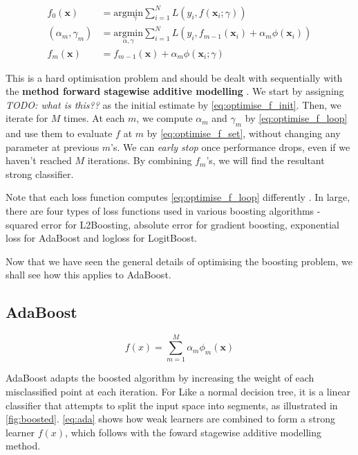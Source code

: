 \begin{align}
  f_0(\mathbf{x}) &= \mathrm{arg} \underset{\gamma}{\mathrm{min}} \sum_{i=1}^{N} L(y_i,f(\mathbf{x}_i ; \gamma)) \label{eq:optimise_f_init}
  \\
  (\alpha_m,\gamma_m) &= \underset{\alpha,\gamma}{\mathrm{argmin}} \sum_{i=1}^{N} L(y_i, f_{m-1}(\mathbf{x}_i) + \alpha_m\phi(\mathbf{x}_i)) \label{eq:optimise_f_loop}
  \\
  f_m(\mathbf{x}) &= f_{m-1}(\mathbf{x}) + \alpha_m\phi(\mathbf{x}_i;\gamma) \label{eq:optimise_f_set}
\end{align}

This is a hard optimisation problem and should be dealt with sequentially with the \textbf{method forward stagewise additive modelling} \cite{mur-book}. We start by assigning \textit{TODO: what is this??} as the initial estimate by \autoref{eq:optimise_f_init}. Then, we iterate for $M$ times. At each $m$, we compute $\alpha_m$ and $\gamma_m$ by \autoref{eq:optimise_f_loop} and use them to evaluate $f$ at $m$ by \autoref{eq:optimise_f_set}, without changing any parameter at previous $m$'s. We can \textit{early stop} once performance drops, even if we haven't reached $M$ iterations. By combining $f_m$'s, we will find the resultant strong classifier. 

Note that each loss function computes \autoref{eq:optimise_f_loop} differently \cite{mur-book}. In large, there are four types of loss functions used in various boosting algorithms - squared error for L2Boosting, absolute error for gradient boosting, exponential loss for AdaBoost and logloss for LogitBoost.

Now that we have seen the general details of optimising the boosting problem, we shall see how this applies to AdaBoost. 


\subsection{AdaBoost}

\begin{equation} \label{eq:ada}
  f(x) = \sum_{m=1}^{M} \alpha_m \phi_m (\mathbf{x})
\end{equation}

AdaBoost adapts the boosted algorithm by increasing the weight of each misclassified point at each iteration. For Like a normal decision tree, it is a linear classifier that attempts to split the input space into segments, as illustrated in \autoref{fig:boosted}. \autoref{eq:ada} shows how weak learners are combined to form a strong learner $f(x)$, which follows with the foward stagewise additive modelling method.

